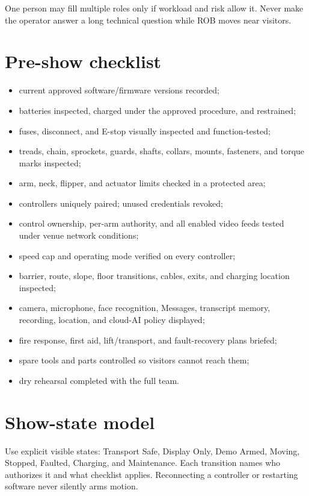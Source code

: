 \documentclass[10pt,openany]{book}
\begin{document}
One person may fill multiple roles only if workload and risk allow it. Never make the operator answer a long technical question while ROB moves near visitors.

\section{Pre-show checklist}

\begin{itemize}[label={\protect\raisebox{0.08em}{\protect\fbox{\protect\rule{0pt}{0.55em}\protect\rule{0.55em}{0pt}}}}]
  \item current approved software/firmware versions recorded;
  \item batteries inspected, charged under the approved procedure, and restrained;
  \item fuses, disconnect, and E-stop visually inspected and function-tested;
  \item treads, chain, sprockets, guards, shafts, collars, mounts, fasteners, and torque marks inspected;
  \item arm, neck, flipper, and actuator limits checked in a protected area;
  \item controllers uniquely paired; unused credentials revoked;
  \item control ownership, per-arm authority, and all enabled video feeds tested under venue network conditions;
  \item speed cap and operating mode verified on every controller;
  \item barrier, route, slope, floor transitions, cables, exits, and charging location inspected;
  \item camera, microphone, face recognition, Messages, transcript memory, recording, location, and cloud-AI policy displayed;
  \item fire response, first aid, lift/transport, and fault-recovery plans briefed;
  \item spare tools and parts controlled so visitors cannot reach them;
  \item dry rehearsal completed with the full team.
\end{itemize}

\section{Show-state model}

Use explicit visible states: Transport Safe, Display Only, Demo Armed, Moving, Stopped, Faulted, Charging, and Maintenance. Each transition names who authorizes it and what checklist applies. Reconnecting a controller or restarting software never silently arms motion.
\end{document}
